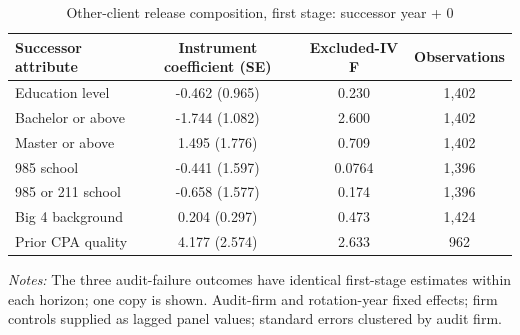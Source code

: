 \begin{table}[htbp]
\footnotesize
\centering
\caption{Other-client release composition, first stage: successor year + 0}
\begin{threeparttable}
\begin{tabular}{p{}ccc}
\toprule
Successor attribute & Instrument coefficient (SE) & Excluded-IV F & Observations \\
\midrule
Education level & -0.462 (0.965) & 0.230 & 1,402 \\
Bachelor or above & -1.744 (1.082) & 2.600 & 1,402 \\
Master or above & 1.495 (1.776) & 0.709 & 1,402 \\
985 school & -0.441 (1.597) & 0.0764 & 1,396 \\
985 or 211 school & -0.658 (1.577) & 0.174 & 1,396 \\
Big 4 background & 0.204 (0.297) & 0.473 & 1,424 \\
Prior CPA quality & 4.177 (2.574) & 2.633 & 962 \\
\bottomrule
\end{tabular}
\begin{tablenotes}\footnotesize
\item \raggedright \textit{Notes:} The three audit-failure outcomes have identical first-stage estimates within each horizon; one copy is shown. Audit-firm and rotation-year fixed effects; firm controls supplied as lagged panel values; standard errors clustered by audit firm.
\end{tablenotes}
\end{threeparttable}
\end{table}
